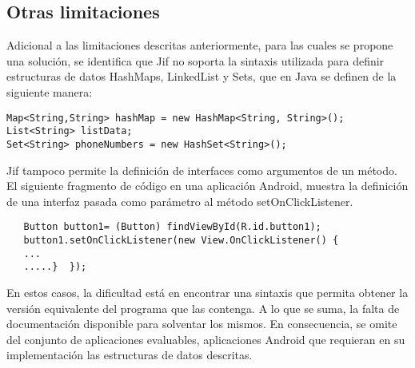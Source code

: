 \subsection{Otras limitaciones}
Adicional a las limitaciones descritas anteriormente, para las cuales se propone
una solución, se identifica que Jif no soporta la sintaxis utilizada para
definir estructuras de datos HashMaps, LinkedList y Sets, que en Java se definen
de la siguiente manera:
\begin{lstlisting}
Map<String,String> hashMap = new HashMap<String, String>();
List<String> listData;
Set<String> phoneNumbers = new HashSet<String>();
\end{lstlisting}
Jif tampoco permite la definición de interfaces como argumentos de un método. El
siguiente fragmento de código  en una aplicación Android, muestra la definición
de una interfaz pasada como parámetro al método setOnClickListener.
\begin{lstlisting}
   Button button1= (Button) findViewById(R.id.button1);
   button1.setOnClickListener(new View.OnClickListener() {
   ...
   .....}  });
\end{lstlisting}
En estos casos, la dificultad está en encontrar una sintaxis que permita obtener
la versión equivalente del programa que las contenga. A lo que se suma, la falta
de documentación disponible para solventar los mismos. En consecuencia, se omite
del conjunto de aplicaciones evaluables, aplicaciones Android que requieran en
su implementación las estructuras de datos descritas.\newline

